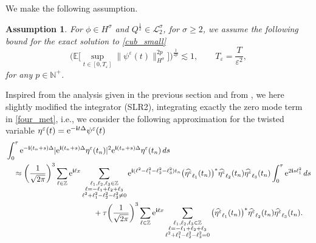 \documentclass[a4paper]{amsart}
\newtheorem{remark}{Remark}[section]
\newtheorem{assumption}[theorem]{Assumption}
\begin{document}
We make the following assumption.
\begin{assumption}
\label{smal_cub_ass}
For $\phi\in H^\sigma$ and $Q^{\frac{1}{2}}\in\mathcal{L}_2^\sigma$, for $\sigma\ge 2$, we assume the following bound for the exact solution to  \eqref{cub_small}
$$
\big(\mathbb{E}\big[\displaystyle\sup_{t\in[0,T_\varepsilon]}\|\psi^\varepsilon(t)\|^{2p}_{H^\sigma}\big]\big)^{\frac{1}{2p}}\lesssim 1, \qquad T_\varepsilon=\frac{T}{\varepsilon^2},
$$
for any $p\in\mathbb{N}^+$.
\end{assumption}
Inspired from the analysis given in the previous section and from \cite{fe_ka}, we here slightly modified the integrator (SLR2), integrating exactly the zero mode term in \eqref{four_met}, i.e., we consider the following approximation for the twisted variable $\eta^\varepsilon(t)={\rm e}^{-{\bf i}t\Delta}\psi^\varepsilon(t)$
\begin{align*}
    &\int_0^\tau {\rm e}^{-{\bf i}(t_n+s)\Delta}|{\rm e}^{{\bf i}(t_n+s)\Delta}\eta^\varepsilon(t_n)|^2 {\rm e}^{{\bf i}(t_n+s)\Delta}\eta^\varepsilon(t_n)\,ds\notag \\
    &\quad \approx \bigg(\frac{1}{\sqrt{2\pi}}\bigg)^{3} \sum_{\ell\in\mathbb{Z}} {\rm e}^{{\bf i}\ell x} \sum_{\substack{\ell_1,\ell_2,\ell_3\in\mathbb{Z}\\ \ell=-\ell_1+\ell_2+\ell_3\\ \ell^2+\ell_1^2-\ell_2^2-\ell_3^2\ne 0}}
    {\rm e}^{{\bf i}(\ell^2-\ell_1^2-\ell_2^2-\ell_3^2) t_n}\big(\widehat{\eta^\varepsilon}_{\ell_1}(t_n)\big)^*
\widehat{\eta^\varepsilon}_{\ell_2}(t_n)\widehat{\eta^\varepsilon}_{\ell_3}(t_n)\int_0^\tau {\rm e}^{2{\bf i}s\ell_1^2}\,ds \\
&\hspace{4cm}+\tau \bigg(\frac{1}{\sqrt{2\pi}}\bigg)^{3} \sum_{\ell\in\mathbb{Z}} {\rm e}^{{\bf i}\ell x}  \sum_{\substack{\ell_1,\ell_2,\ell_3\in\mathbb{Z}\\ \ell=-\ell_1+\ell_2+\ell_3\\ \ell^2+\ell_1^2-\ell_2^2-\ell_3^2= 0}}  \big(\widehat{\eta^\varepsilon}_{\ell_1}(t_n)\big)^*
\widehat{\eta^\varepsilon}_{\ell_2}(t_n)\widehat{\eta^\varepsilon}_{\ell_3}(t_n).
\end{align*}
\end{document}
